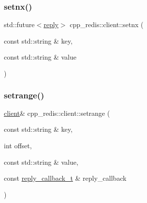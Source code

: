 \mbox{\label{classcpp__redis_1_1client_a1ab0db92e48716812e4b30b268ce29ea}} 
\subsubsection{\texorpdfstring{setnx()}{setnx()}\hspace{0.1cm}{\footnotesize\ttfamily [2/2]}}
{\footnotesize\ttfamily std\+::future$<$\hyperlink{classcpp__redis_1_1reply}{reply}$>$ cpp\+\_\+redis\+::client\+::setnx (\begin{DoxyParamCaption}\item[{const std\+::string \&}]{key,  }\item[{const std\+::string \&}]{value }\end{DoxyParamCaption})}

\mbox{\label{classcpp__redis_1_1client_a3c1a2d69d9473de409f9102b61496f47}} 
\subsubsection{\texorpdfstring{setrange()}{setrange()}\hspace{0.1cm}{\footnotesize\ttfamily [1/2]}}
{\footnotesize\ttfamily \hyperlink{classcpp__redis_1_1client}{client}\& cpp\+\_\+redis\+::client\+::setrange (\begin{DoxyParamCaption}\item[{const std\+::string \&}]{key,  }\item[{int}]{offset,  }\item[{const std\+::string \&}]{value,  }\item[{const \hyperlink{classcpp__redis_1_1client_a061a1140d36d2eaeda82b09a0bb3f9f2}{reply\+\_\+callback\+\_\+t} \&}]{reply\+\_\+callback }\end{DoxyParamCaption})}

\mbox{\label{classcpp__redis_1_1client_a628f79b8f8e424cdd4b70c076c21338a}} 
